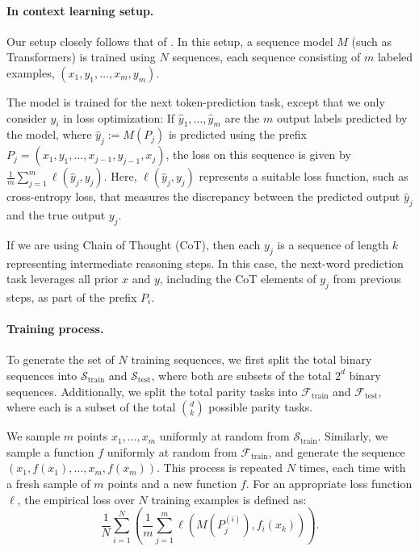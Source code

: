 
\paragraph{In context learning setup.} Our setup closely follows that of \cite{garg2022can, bhattamishra2024understanding}. In this setup, a
sequence model $M$ (such as Transformers) is trained using $N$ sequences, each sequence consisting of
$m$ labeled examples, $(x_1, y_1, \dots, x_m, y_m)$.

The model is trained for the next token-prediction task,
except that we only consider $y_i$ in loss optimization: If $\hat{y}_1, \dots, \hat{y}_m$ are the $m$ output labels predicted
by the model, where $\hat{y}_j := M(P_j)$ is predicted using the prefix $P_j = (x_1, y_1, \dots, x_{j-1}, y_{j-1}, x_j)$,
the loss on this sequence is given by $\frac{1}{m} \sum_{j=1}^m \ell(\hat{y}_j, y_j)$. Here, $\ell(\hat{y}_j, y_j)$ represents a suitable loss function, such as cross-entropy loss, that measures the discrepancy between the predicted output $\hat{y}_j$ and the true output $y_j$.

If we are using Chain of Thought (CoT), then each $y_j$ is a sequence of length $k$ representing intermediate reasoning steps. In this case, the next-word prediction task leverages all prior $x$ and $y$, including the CoT elements of $y_j$ from previous steps, as part of the prefix $P_i$. 



\paragraph{Training process.} To generate the set of $N$ training sequences, we first split the total binary sequences into $\mathcal{S}_{\text{train}}$ and $\mathcal{S}_{\text{test}}$, where both are subsets of the total $2^d$ binary sequences. Additionally, we split the total parity tasks into $\mathcal{F}_{\text{train}}$ and $\mathcal{F}_{\text{test}}$, where each is a subset of the total $\binom{d}{k}$ possible parity tasks.





We sample $m$ points $x_1, \dots, x_m$ uniformly at random from $\mathcal{S}_{\text{train}}$. Similarly, we sample a function $f$ uniformly at random from $\mathcal{F}_{\text{train}}$, and generate the sequence $(x_1, f(x_1), \dots, x_m, f(x_m))$. This process is repeated $N$ times, each time with a fresh sample of $m$ points and a new function $f$. For an appropriate loss function $\ell$, the empirical loss over $N$ training examples is defined as: 
\begin{equation} \frac{1}{N} \sum_{i=1}^N \left( \frac{1}{m} \sum_{j=1}^m \ell\left(M(P_j^{(i)}), f_i(x_k)\right) \right). \end{equation}




